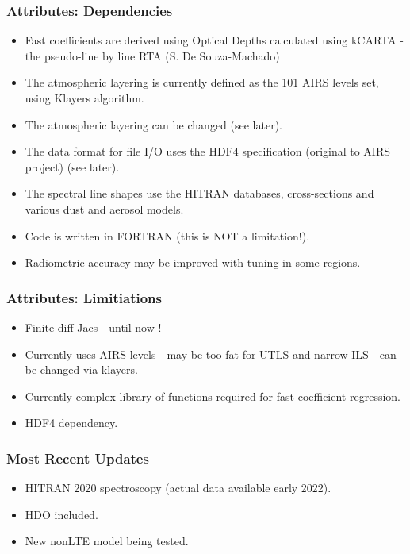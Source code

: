 \documentclass[10pt,t]{beamer}
\begin{document}
\begin{frame}
  \frametitle{Attributes: Dependencies}
  \begin{itemize}
    \item Fast coefficients are derived using Optical Depths calculated using kCARTA - the pseudo-line by line
    RTA (S. De Souza-Machado)
    \item The atmospheric layering is currently defined as the 101 AIRS levels set, using Klayers algorithm.
    \item The atmospheric layering can be changed (see later).
    \item The data format for file I/O uses the HDF4 specification (original to AIRS project) (see later).
    \item The spectral line shapes use the HITRAN databases, cross-sections and various dust and aerosol models.
    \item Code is written in FORTRAN (this is NOT a limitation!).
    \item Radiometric accuracy may be improved with tuning in some regions.
  \end{itemize}
\end{frame}

\begin{frame}
  \frametitle{Attributes: Limitiations}
  \begin{itemize}
  \item Finite diff Jacs - until now !
  \item Currently uses AIRS levels - may be too fat for UTLS and narrow ILS - can be changed
    via klayers.
  \item Currently complex library of functions required for fast coefficient regression.
  \item HDF4 dependency. 
  \end{itemize}
\end{frame}

\begin{frame}
  \frametitle{Most Recent Updates}
  \begin{itemize}
    \item HITRAN 2020 spectroscopy (actual data available early 2022).
    \item HDO included.
    \item New nonLTE model being tested.
  \end{itemize}
\end{frame}
\end{document}

